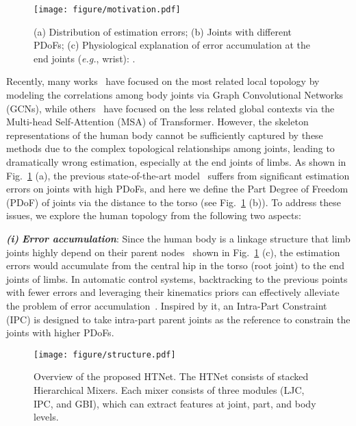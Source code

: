 \documentclass{article}
\def\VspaceFa{\vspace{-0.40cm}}
\def\VspaceFb{\vspace{-0.30cm}}
\begin{document}
\begin{figure}[t]
    \centering
    \texttt{[image: figure/motivation.pdf]}
    \VspaceFa
    \vspace{-0.30cm}
    \caption
    {
        (a) Distribution of estimation errors; (b) Joints with different PDoFs;  (c) Physiological explanation of error accumulation at the end joints (\textit{e.g.}, wrist): .
    }
    \VspaceFb
    \label{fig:motivation}
\end{figure}

Recently, many works~\cite{stgcn,mgcn,li2022graphmlp} have focused on the most related local topology by modeling the correlations among body joints via Graph Convolutional Networks (GCNs), while others~\cite{lightpose,poseformer,mhformer} have focused on the less related global contexts via the Multi-head Self-Attention (MSA) of Transformer. 
However, the skeleton representations of the human body cannot be sufficiently captured by these methods due to the complex topological relationships among joints, leading to dramatically wrong estimation, especially at the end joints of limbs.
As shown in Fig.~\ref{fig:motivation} (a), the previous state-of-the-art model~\cite{mgcn} suffers from significant estimation errors on joints with high PDoFs, and here we define the Part Degree of Freedom (PDoF) of joints via the distance to the torso (see Fig.~\ref{fig:motivation} (b)). To address these issues, we explore the human topology from the following two aspects: 

\textit{\textbf{(i)}} \textbf{\textit{Error accumulation}}: 
Since the human body is a linkage structure that limb joints highly depend on their parent nodes~\cite{wu2021limb} shown in Fig.~\ref{fig:motivation} (c), the estimation errors would accumulate from the central hip in the torso (root joint) to the end joints of limbs. 
In automatic control systems, backtracking to the previous points with fewer errors and leveraging their kinematics priors can effectively alleviate the problem of error accumulation~\cite{ backtracking,backtracking_1}.
Inspired by it, an Intra-Part Constraint (IPC) is designed to take intra-part parent joints as the reference to constrain the joints with higher PDoFs. 

\begin{figure*}[t]
\centering
\VspaceFa
\texttt{[image: figure/structure.pdf]}
\caption
{
Overview of the proposed HTNet. The HTNet consists of  stacked Hierarchical Mixers. Each mixer consists of three modules (LJC, IPC, and GBI), which can extract features at joint, part, and body levels.
}
\vspace{-0.5cm}
\label{fig:fig2}
\end{figure*}
\end{document}
